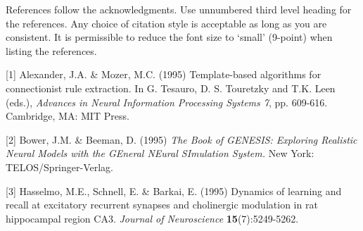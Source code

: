 \documentclass{article}
\begin{document}
References follow the acknowledgments. Use unnumbered third level heading for
the references. Any choice of citation style is acceptable as long as you are
consistent. It is permissible to reduce the font size to `small' (9-point) 
when listing the references.

\small{
[1] Alexander, J.A. \& Mozer, M.C. (1995) Template-based algorithms
for connectionist rule extraction. In G. Tesauro, D. S. Touretzky
and T.K. Leen (eds.), {\it Advances in Neural Information Processing
Systems 7}, pp. 609-616. Cambridge, MA: MIT Press.

[2] Bower, J.M. \& Beeman, D. (1995) {\it The Book of GENESIS: Exploring
Realistic Neural Models with the GEneral NEural SImulation System.}
New York: TELOS/Springer-Verlag.

[3] Hasselmo, M.E., Schnell, E. \& Barkai, E. (1995) Dynamics of learning
and recall at excitatory recurrent synapses and cholinergic modulation
in rat hippocampal region CA3. {\it Journal of Neuroscience}
{\bf 15}(7):5249-5262.
}
\end{document}

